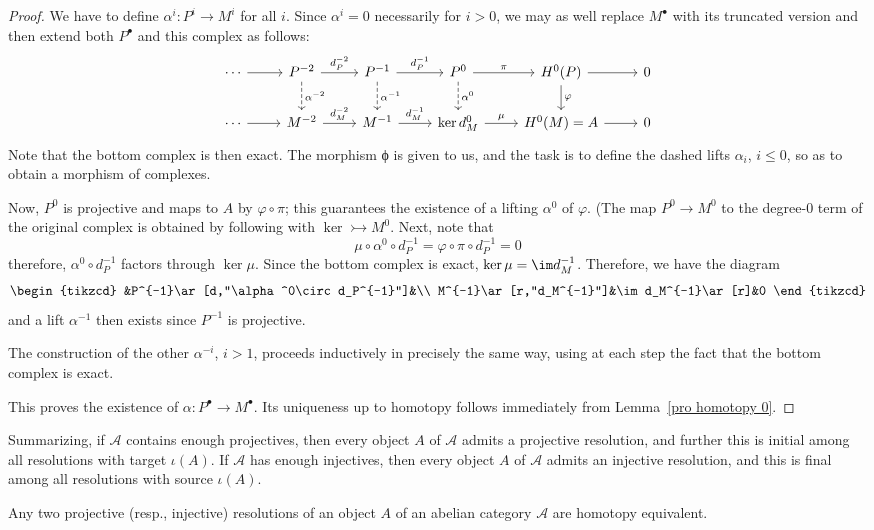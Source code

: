 \begin{proof}
We have to define $\alpha^i:P^i\to M^i$ for all $i$. Since $\alpha^i=0$ necessarily for $i>0$, we may as well replace $M^\bullet$ with its truncated version and then extend both $P^\bullet$ and this complex as follows:
\[\begin{tikzcd}
\cdots\ar[r]&P^{-2}\ar[d,dashed,"\alpha^{-2}"]\ar[r,"d_P^{-2}"]&P^{-1}\ar[d,dashed,"\alpha^{-1}"]\ar[r,"d_P^{-1}"]&P^{0}\ar[r,"\pi"]\ar[d,dashed,"\alpha^{0}"]&H^0(P)\ar[d,"\varphi"]\ar[r]&0\\
\cdots\ar[r]&M^{-2}\ar[r,"d_M^{-2}"]&M^{-1}\ar[r,"d_M^{-1}"]&\ker d^0_M\ar[r,"\mu"]&H^0(M)=A\ar[r]&0
\end{tikzcd}\]
Note that the bottom complex is then exact. The morphism ϕ is given to us, and the task is to define the dashed lifts $\alpha_i$, $i\leqslant 0$, so as to obtain a morphism of complexes.\par
Now, $P^0$ is projective and maps to $A$ by $\varphi\circ\pi$; this guarantees the existence of a lifting $\alpha^0$ of $\varphi$. (The map $P^0\to M^0$ to the degree-$0$ term of the original complex
is obtained by following with $\ker\rightarrowtail M^0$. Next, note that
\[\mu\circ\alpha^0\circ d_P^{-1}=\varphi\circ\pi\circ d_P^{-1}=0\]
therefore, $\alpha^0\circ d_P^{-1}$ factors through $\ker\mu$. Since the bottom complex is exact, $\ker\mu=\im d_M^{-1}$. Therefore, we have the diagram
\[\begin{tikzcd}
&P^{-1}\ar[d,"\alpha^0\circ d_P^{-1}"]&\\
M^{-1}\ar[r,"d_M^{-1}"]&\im d_M^{-1}\ar[r]&0
\end{tikzcd}\]
and a lift $\alpha^{-1}$ then exists since $P^{-1}$ is projective.\par
The construction of the other $\alpha^{-i}$, $i>1$, proceeds inductively in precisely the same way, using at each step the fact that the bottom complex is exact.\par
This proves the existence of $\alpha:P^\bullet\to M^\bullet$. Its uniqueness up to homotopy follows immediately from Lemma~\ref{pro homotopy 0}.
\end{proof}
Summarizing, if $\mathcal{A}$ contains enough projectives, then every object $A$ of $\mathcal{A}$ admits a projective resolution, and further this is initial among all resolutions with target
$\iota(A)$. If $\mathcal{A}$ has enough injectives, then every object $A$ of $\mathcal{A}$ admits an injective resolution, and this is final among all resolutions with source $\iota(A)$.
\begin{proposition}\label{reso homotopic}
Any two projective (resp., injective) resolutions of an object $A$ of an abelian category $\mathcal{A}$ are homotopy equivalent.
\end{proposition}

